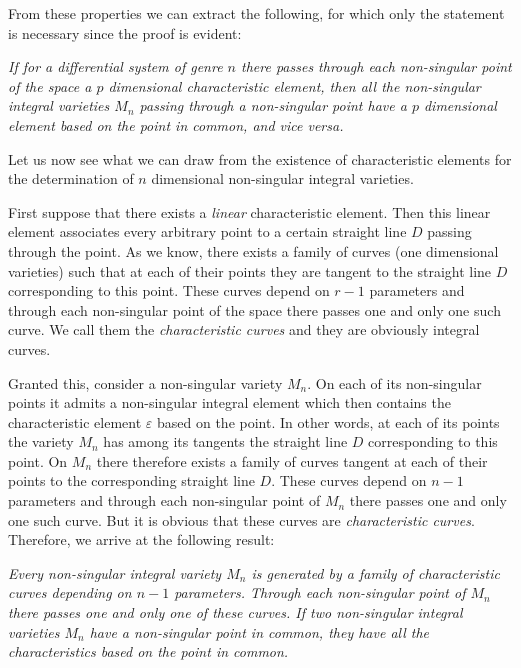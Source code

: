 \documentclass[leqno,11pt]{book}
\makeatletter
\theoremstyle{shape1}
\theoremstyle{shapesmall}
\let\old@epsilon\epsilon
\let\old@varepsilon\varepsilon
\let\epsilon\old@varepsilon
\let\varepsilon\old@epsilon
\newcommand{\somespace}{\vspace{9pt}}
\makeatother
\begin{document}
From these properties we can extract the following, for which only the statement is necessary since the proof is evident:

\somespace

\emph{If for a differential system of genre $n$ there passes through each non-singular point of the space a $p$ dimensional characteristic element, then all the non-singular integral varieties $M_{n}$ passing through a non-singular point have a $p$ dimensional element based on the point in common, and vice versa.}

\somespace

Let us now see what we can draw from the existence of characteristic elements for the determination of $n$ dimensional non-singular integral varieties.

First suppose that there exists a \emph{linear} characteristic element. Then this linear element associates every arbitrary point to a certain straight line $D$ passing through the point. As we know, there exists a family of curves (one dimensional varieties) such that at each of their points they are tangent to the straight line $D$ corresponding to this point. These curves depend on $r-1$ parameters and through each non-singular point of the space there passes one and only one such curve. We call them the \emph{characteristic curves} and they are obviously integral curves.

Granted this, consider a non-singular variety $M_{n}$. On each of its non-singular points it admits a non-singular integral element which then contains the characteristic element $\epsilon$ based on the point. In other words, at each of its points the variety $M_{n}$ has among its tangents the straight line $D$ corresponding to this point. On $M_{n}$ there therefore exists a family of curves tangent at each of their points to the corresponding straight line $D$. These curves depend on $n-1$ parameters and through each non-singular point of $M_{n}$ there passes one and only one such curve. But it is obvious that these curves are \emph{characteristic curves}. Therefore, we arrive at the following result:

\somespace

\emph{Every non-singular integral variety $M_{n}$ is generated by a family of characteristic curves depending on $n-1$ parameters. Through each non-singular point of $M_{n}$ there passes one and only one of these curves. If two non-singular integral varieties $M_{n}$ have a non-singular point in common, they have all the characteristics based on the point in common.}
\end{document}
